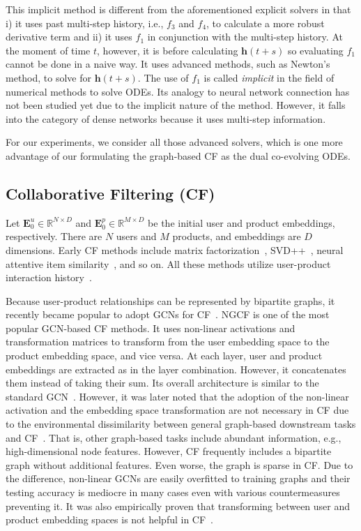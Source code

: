 \documentclass[sigconf]{acmart}
\begin{document}
This implicit method is different from the aforementioned explicit solvers in that i) it uses past multi-step history, i.e., $f_3$ and $f_4$, to calculate a more robust derivative term and ii) it uses $f_1$ in conjunction with the multi-step history. At the moment of time $t$, however, it is before calculating $\bm{h}(t+s)$ so evaluating $f_1$ cannot be done in a naive way. It uses advanced methods, such as Newton's method, to solve for $\bm{h}(t + s)$. The use of $f_1$ is called \emph{implicit} in the field of numerical methods to solve ODEs. Its analogy to neural network connection has not been studied yet due to the implicit nature of the method. However, it falls into the category of dense networks because it uses multi-step information.

For our experiments, we consider all those advanced solvers, which is one more advantage of our formulating the graph-based CF as the dual co-evolving ODEs.



\subsection{Collaborative Filtering (CF)} Let $\bm{E}^u_0 \in \mathbb{R}^{N \times D}$ and $\bm{E}^p_0 \in \mathbb{R}^{M \times D}$ be the initial user and product embeddings, respectively. There are $N$ users and $M$ products, and embeddings are $D$ dimensions. Early CF methods include matrix factorization~\cite{5197422}, SVD++~\cite{10.1145/1401890.1401944}, neural attentive item similarity~\cite{8352808}, and so on. All these methods utilize user-product interaction history~\cite{10.1145/3285029}.




Because user-product relationships can be represented by bipartite graphs, it recently became popular to adopt GCNs for CF~\cite{10.1145/3331184.3331267,Chen_Wu_Hong_Zhang_Wang_2020,10.1145/3397271.3401063}. NGCF is one of the most popular GCN-based CF methods. It uses non-linear activations and transformation matrices to transform from the user embedding space to the product embedding space, and vice versa. At each layer, user and product embeddings are extracted as in the layer combination. However, it concatenates them instead of taking their sum. Its overall architecture is similar to the standard GCN~\cite{kipf2017semi}. However, it was later noted that the adoption of the non-linear activation and the embedding space transformation are not necessary in CF due to the environmental dissimilarity between general graph-based downstream tasks and CF~\cite{10.1145/3397271.3401063}. That is, other graph-based tasks include abundant information, e.g., high-dimensional node features. However, CF frequently includes a bipartite graph without additional features. Even worse, the graph is sparse in CF. Due to the difference, non-linear GCNs are easily overfitted to training graphs and their testing accuracy is mediocre in many cases even with various countermeasures preventing it. It was also empirically proven that transforming between user and product embedding spaces is not helpful in CF~\cite{10.1145/3397271.3401063}.
\end{document}
